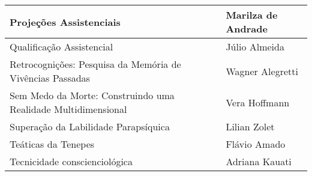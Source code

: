 \documentclass{gescons}
\begin{document}
\begin{longtable}[]{@{}
  >{\raggedright\arraybackslash}p{}
  >{\raggedright\arraybackslash}p{}@{}}
\hline
\begin{minipage}[b]{\linewidth}\raggedright
Projeções Assistenciais
\end{minipage} & \begin{minipage}[b]{\linewidth}\raggedright
Marilza de Andrade
\end{minipage} \\
\hline
\begin{minipage}[b]{\linewidth}\raggedright
Qualificação Assistencial
\end{minipage} & \begin{minipage}[b]{\linewidth}\raggedright
Júlio Almeida
\end{minipage} \\
\hline
\begin{minipage}[b]{\linewidth}\raggedright
Retrocognições: Pesquisa da Memória de Vivências Passadas
\end{minipage} & \begin{minipage}[b]{\linewidth}\raggedright
Wagner Alegretti
\end{minipage} \\
\hline
\begin{minipage}[b]{\linewidth}\raggedright
Sem Medo da Morte: Construindo uma Realidade Multidimensional
\end{minipage} & \begin{minipage}[b]{\linewidth}\raggedright
Vera Hoffmann
\end{minipage} \\
\hline
\begin{minipage}[b]{\linewidth}\raggedright
Superação da Labilidade Parapsíquica
\end{minipage} & \begin{minipage}[b]{\linewidth}\raggedright
Lilian Zolet
\end{minipage} \\
\hline
\begin{minipage}[b]{\linewidth}\raggedright
Teáticas da Tenepes
\end{minipage} & \begin{minipage}[b]{\linewidth}\raggedright
Flávio Amado
\end{minipage} \\
\hline
\begin{minipage}[b]{\linewidth}\raggedright
Tecnicidade conscienciológica
\end{minipage} & \begin{minipage}[b]{\linewidth}\raggedright
Adriana Kauati
\end{minipage} \\

\end{longtable}
\end{document}
